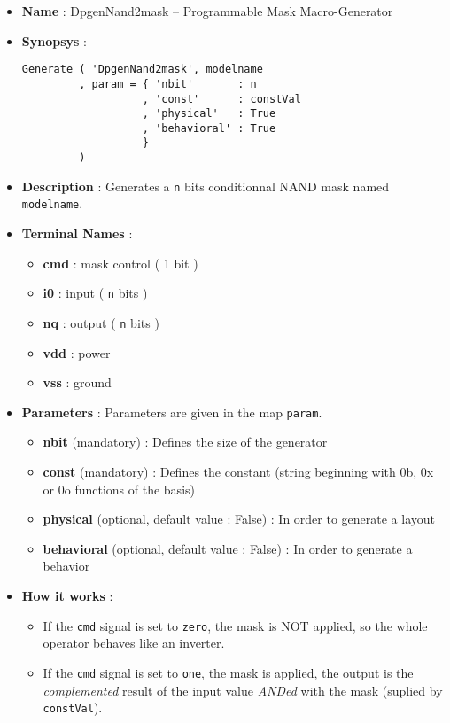 \begin{itemize}
    \item \textbf{Name} : DpgenNand2mask -- Programmable Mask Macro-Generator
    \item \textbf{Synopsys} :
\begin{verbatim}
Generate ( 'DpgenNand2mask', modelname
         , param = { 'nbit'       : n
                   , 'const'      : constVal
                   , 'physical'   : True
                   , 'behavioral' : True                   
                   }
         )
\end{verbatim}
    \item \textbf{Description} : Generates a \verb-n- bits conditionnal NAND mask named \verb-modelname-.
    \item \textbf{Terminal Names} :
    \begin{itemize}
        \item \textbf{cmd} : mask control ( 1 bit )
        \item \textbf{i0} : input ( \verb-n- bits )
        \item \textbf{nq} : output ( \verb-n- bits )
        \item \textbf{vdd} : power
        \item \textbf{vss} : ground
    \end{itemize}
    \item \textbf{Parameters} : Parameters are given in the map \verb-param-.
    \begin{itemize}
        \item \textbf{nbit} (mandatory) : Defines the size of the generator
        \item \textbf{const} (mandatory) : Defines the constant (string beginning with 0b, 0x or 0o functions of the basis)
        \item \textbf{physical} (optional, default value : False) : In order to generate a layout
        \item \textbf{behavioral} (optional, default value : False) : In order to generate a behavior        
    \end{itemize}
    \item \textbf{How it works} :
    \begin{itemize}
        \item If the \verb-cmd- signal is set to \verb-zero-, the mask is NOT applied, so the whole operator behaves like an inverter.
        \item If the \verb-cmd- signal is set to \verb-one-, the mask is applied, the output is the \emph{complemented} result of the input value \emph{ANDed} with the mask (suplied by \verb-constVal-).

\end{itemize}
\end{itemize}

